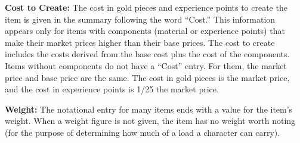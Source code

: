 \textbf{Cost to Create:} The cost in gold pieces and experience points to create the item is given in the summary following the word ``Cost.'' This information appears only for items with components (material or experience points) that make their market prices higher than their base prices. The cost to create includes the costs derived from the base cost plus the cost of the components. Items without components do not have a ``Cost'' entry. For them, the market price and base price are the same. The cost in gold pieces is \onehalf the market price, and the cost in experience points is 1/25 the market price.

\textbf{Weight:} The notational entry for many items ends with a value for the item's weight. When a weight figure is not given, the item has no weight worth noting (for the purpose of determining how much of a load a character can carry).




